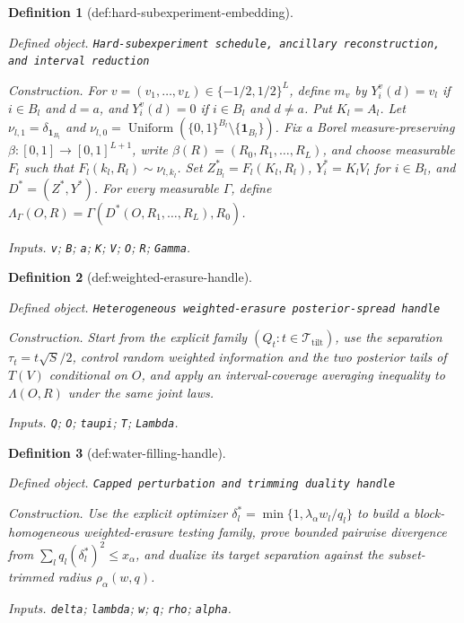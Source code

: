 \documentclass{article}
\newtheorem{definition}{Definition}
\begin{document}
\begin{definition}[def:hard-subexperiment-embedding]\label{def:hard-subexperiment-embedding}
\par\smallskip\noindent\emph{Defined object.} \texttt{Hard-\allowbreak{}subexperiment schedule,\allowbreak{} ancillary reconstruction,\allowbreak{} and interval reduction}
\par\smallskip\noindent\emph{Construction.} For \(v=(v_1,\ldots,v_L)\in\{-1/2,1/2\}^L\), define \(m_v\) by \(Y_i^v(d)=v_l\) if \(i\in B_l\) and \(d=a\), and \(Y_i^v(d)=0\) if \(i\in B_l\) and \(d\ne a\). Put \(K_l=A_l\). Let \(\nu_{l,1}=\delta_{\mathbf 1_{B_l}}\) and \(\nu_{l,0}=\operatorname{Uniform}(\{0,1\}^{B_l}\setminus\{\mathbf 1_{B_l}\})\). Fix a Borel measure-preserving \(\beta:[0,1]\to[0,1]^{L+1}\), write \(\beta(R)=(R_0,R_1,\ldots,R_L)\), and choose measurable \(F_l\) such that \(F_l(k_l,R_l)\sim\nu_{l,k_l}\). Set \(Z^*_{B_l}=F_l(K_l,R_l)\), \(Y_i^*=K_lV_l\) for \(i\in B_l\), and \(D^*=(Z^*,Y^*)\). For every measurable \(\Gamma\), define \(\Lambda_\Gamma(O,R)=\Gamma(D^*(O,R_1,\ldots,R_L),R_0)\).
\par\smallskip\noindent\emph{Inputs.} \texttt{v}; \texttt{B}; \texttt{a}; \texttt{K}; \texttt{V}; \texttt{O}; \texttt{R}; \texttt{Gamma}.
\end{definition}

\begin{definition}[def:weighted-erasure-handle]\label{def:weighted-erasure-handle}
\par\smallskip\noindent\emph{Defined object.} \texttt{Heterogeneous weighted-\allowbreak{}erasure posterior-\allowbreak{}spread handle}
\par\smallskip\noindent\emph{Construction.} Start from the explicit family \((Q_t:t\in\mathcal T_{\mathrm{tilt}})\), use the separation \(\tau_t=t\sqrt S/2\), control random weighted information and the two posterior tails of \(T(V)\) conditional on \(O\), and apply an interval-coverage averaging inequality to \(\Lambda(O,R)\) under the same joint laws.
\par\smallskip\noindent\emph{Inputs.} \texttt{Q}; \texttt{O}; \texttt{taupi}; \texttt{T}; \texttt{Lambda}.
\end{definition}

\begin{definition}[def:water-filling-handle]\label{def:water-filling-handle}
\par\smallskip\noindent\emph{Defined object.} \texttt{Capped perturbation and trimming duality handle}
\par\smallskip\noindent\emph{Construction.} Use the explicit optimizer \(\delta_l^*=\min\{1,\lambda_\alpha w_l/q_l\}\) to build a block-homogeneous weighted-erasure testing family, prove bounded pairwise divergence from \(\sum_lq_l(\delta_l^*)^2\le x_\alpha\), and dualize its target separation against the subset-trimmed radius \(\rho_\alpha(w,q)\).
\par\smallskip\noindent\emph{Inputs.} \texttt{delta}; \texttt{lambda}; \texttt{w}; \texttt{q}; \texttt{rho}; \texttt{alpha}.
\end{definition}
\end{document}
